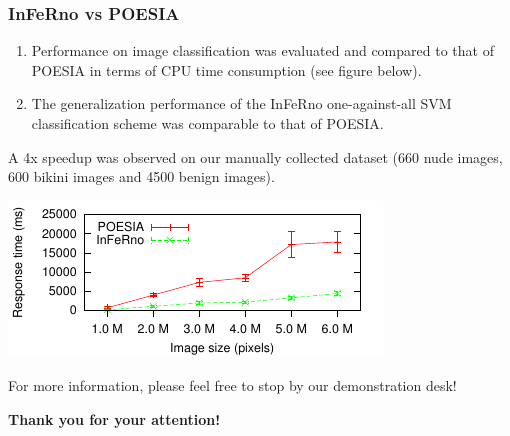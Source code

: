 \documentclass{beamer}
\begin{document}
\begin{frame}
\frametitle{InFeRno vs POESIA}
\begin{enumerate}
\item Performance on image classification was evaluated and compared to that of POESIA in terms of CPU time consumption (see figure below).
\item The generalization performance of the InFeRno one-against-all SVM classification scheme was comparable to that of POESIA.
\end{enumerate}
\begin{block}
{}
A 4x speedup was observed on our manually collected dataset (660 nude images, 600 bikini images and 4500 benign images).
\end{block}
\begin{center}
\includegraphics[scale=1.3]{images/scatter-p-t-all-bars.pdf}
\end{center}
\end{frame}

\begin{frame}
\centerline{For more information, please feel free to stop by our demonstration desk!}
\centerline{\bf{Thank you for your attention! \smiley}}
\end{frame}
\end{document}

